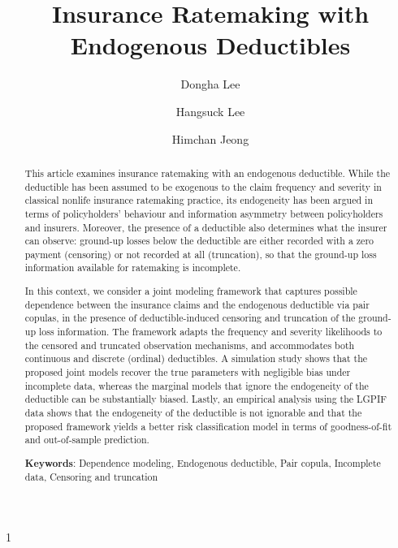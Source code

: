 \documentclass[11pt]{article}
\newcommand{\rev}[1]{{\color{blue}#1}}
\newcommand{\blind}{1}
\begin{document}
\linenumbers
	\setlength{\abovedisplayskip}{6pt}
	\setlength{\belowdisplayskip}{6pt}
	\setlength{\abovedisplayshortskip}{6pt}
	\setlength{\belowdisplayshortskip}{6pt}	
\blind
{
	\title{Insurance Ratemaking with Endogenous Deductibles}	
\author[1]{Dongha Lee}
\author[2]{Hangsuck Lee}
\author[1,3,*]{Himchan Jeong}


	\date{}	
	\maketitle
} \fi


\begin{abstract}
\rev{This article examines insurance ratemaking with an endogenous deductible. While the deductible has been assumed to be exogenous to the claim frequency and severity in classical nonlife insurance ratemaking practice, its endogeneity has been argued in terms of policyholders' behaviour and information asymmetry between policyholders and insurers. Moreover, the presence of a deductible also determines what the insurer can observe: ground-up losses below the deductible are either recorded with a zero payment (censoring) or not recorded at all (truncation), so that the ground-up loss information available for ratemaking is incomplete.

In this context, we consider a joint modeling framework that captures possible dependence between the insurance claims and the endogenous deductible via pair copulas, in the presence of deductible-induced censoring and truncation of the ground-up loss information. The framework adapts the frequency and severity likelihoods to the censored and truncated observation mechanisms, and accommodates both continuous and discrete (ordinal) deductibles. A simulation study shows that the proposed joint models recover the true parameters with negligible bias under incomplete data, whereas the marginal models that ignore the endogeneity of the deductible can be substantially biased. Lastly, an empirical analysis using the LGPIF data shows that the endogeneity of the deductible is not ignorable and that the proposed framework yields a better risk classification model in terms of goodness-of-fit and out-of-sample prediction.}



\textbf{Keywords}: Dependence modeling, Endogenous deductible, Pair copula, Incomplete data, \rev{Censoring and truncation}

\end{abstract}
%
%
\end{document}
